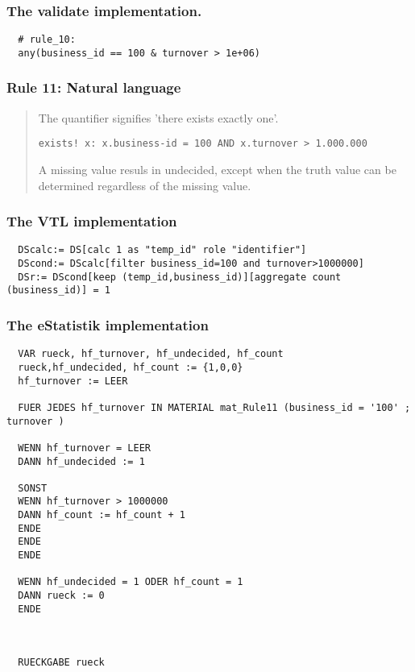 \subsubsection*{The validate implementation.}
\begin{verbatim}
  # rule_10:
  any(business_id == 100 & turnover > 1e+06)
\end{verbatim}


\newpage

\subsubsection*{  Rule 11: Natural language}
\begin{quote}


The  quantifier signifies 'there exists exactly one'.


\begin{verbatim}
exists! x: x.business-id = 100 AND x.turnover > 1.000.000
\end{verbatim}

A missing value resuls in undecided, except when the truth value can be determined regardless of the missing value.



\end{quote}
\subsubsection*{The VTL implementation}
\begin{verbatim}
  DScalc:= DS[calc 1 as "temp_id" role "identifier"]
  DScond:= DScalc[filter business_id=100 and turnover>1000000]
  DSr:= DScond[keep (temp_id,business_id)][aggregate count (business_id)] = 1
\end{verbatim}
\subsubsection*{The eStatistik implementation}
\begin{verbatim}
  VAR rueck, hf_turnover, hf_undecided, hf_count
  rueck,hf_undecided, hf_count := {1,0,0}
  hf_turnover := LEER

  FUER JEDES hf_turnover IN MATERIAL mat_Rule11 (business_id = '100' ; turnover )

  WENN hf_turnover = LEER
  DANN hf_undecided := 1

  SONST
  WENN hf_turnover > 1000000
  DANN hf_count := hf_count + 1
  ENDE
  ENDE
  ENDE

  WENN hf_undecided = 1 ODER hf_count = 1
  DANN rueck := 0
  ENDE



  RUECKGABE rueck
\end{verbatim}
